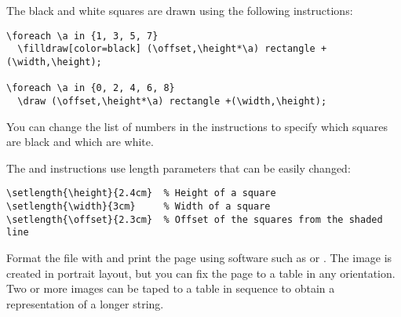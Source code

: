 The black and white squares are drawn using the following instructions: 
\begin{footnotesize}
\begin{verbatim}
\foreach \a in {1, 3, 5, 7}
  \filldraw[color=black] (\offset,\height*\a) rectangle +(\width,\height);

\foreach \a in {0, 2, 4, 6, 8}
  \draw (\offset,\height*\a) rectangle +(\width,\height);
\end{verbatim}
\end{footnotesize}
You can change the list of numbers in the  instructions
to specify which squares are black and which are white.

The  and  instructions use length parameters that
can be easily changed:
\begin{footnotesize}
\begin{verbatim}
\setlength{\height}{2.4cm}  % Height of a square
\setlength{\width}{3cm}     % Width of a square
\setlength{\offset}{2.3cm}  % Offset of the squares from the shaded line
\end{verbatim}
\end{footnotesize}

Format the file with  and print the page using software
such as  or . The image is created in
portrait layout, but you can fix the page to a table in any orientation.
Two or more images can be taped to a table in sequence to obtain a
representation of a longer string.
